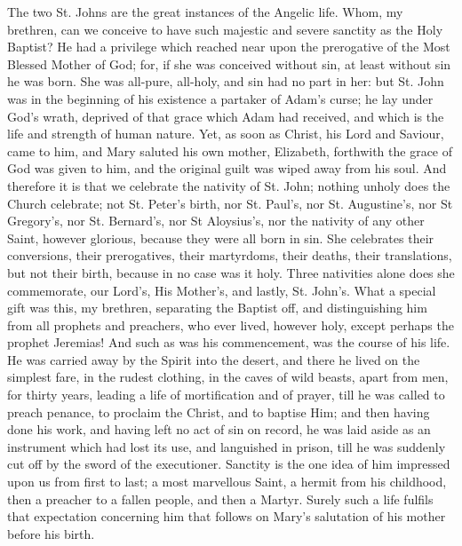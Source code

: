 The two St. Johns are the great instances of the Angelic life.
Whom, my brethren, can we conceive to have such majestic and severe
sanctity as the Holy Baptist? He had a privilege which reached near
upon the prerogative of the Most Blessed Mother of God; for, if she
was conceived without sin, at least without sin he was born. She was
all-pure, all-holy, and sin had no part in her: but St. John was in
the beginning of his existence a partaker of Adam's curse; he lay
under God's wrath, deprived of that grace which Adam had received, and
which is the life and strength of human nature. Yet, as soon as
Christ, his Lord and Saviour, came to him, and Mary saluted his own
mother, Elizabeth, forthwith the grace of God was given to him, and
the original guilt was wiped away from his soul. And therefore it is
that we celebrate the nativity of St. John; nothing unholy does the
Church celebrate; not St. Peter's birth, nor St. Paul's, nor St.
Augustine's, nor St Gregory's, nor St. Bernard's, nor St Aloysius's,
nor the nativity of any other Saint, however glorious, because they
were all born in sin. She celebrates their conversions, their
prerogatives, their martyrdoms, their deaths, their translations, but
not their birth, because in no case was it holy. Three nativities
alone does she commemorate, our Lord's, His Mother's, and lastly, St.
John's. What a special gift was this, my brethren, separating the
Baptist off, and distinguishing him from all prophets and preachers,
who ever lived, however holy, except perhaps the prophet Jeremias! And
such as was his commencement, was the course of his life. He was
carried away by the Spirit into the desert, and there he lived on the
simplest fare, in the rudest clothing, in the caves of wild beasts,
apart from men, for thirty years, leading a life of mortification and
of prayer, till he was called to preach penance, to proclaim the
Christ, and to baptise Him; and then having done his work, and having
left no act of sin on record, he was laid aside as an instrument which
had lost its use, and languished in prison, till he was suddenly cut
off by the sword of the executioner. Sanctity is the one idea of him
impressed upon us from first to last; a most marvellous Saint, a
hermit from his childhood, then a preacher to a fallen people, and
then a Martyr. Surely such a life fulfils that expectation concerning
him that follows on Mary's salutation of his mother before his birth.

